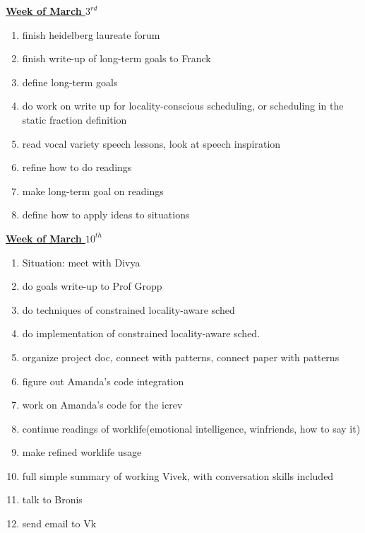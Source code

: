 
\underline{\textbf{Week of March $3^{rd}$}} \\
\begin{enumerate}
\item finish heidelberg laureate forum
\item finish write-up of long-term goals to Franck

\item  define long-term goals
\item  do work on write up for locality-conscious scheduling, or scheduling in the static fraction definition

\item read vocal variety speech lessons, look at speech inspiration
\item refine how to do readings
\item make long-term goal on readings
\item define how to apply ideas to situations

\end{enumerate}

\underline{\textbf{Week of March $10^{th}$}} \\
\begin{enumerate}

\item Situation: meet with Divya
\item do goals write-up to Prof Gropp

\item do techniques of constrained locality-aware sched
\item do implementation of constrained locality-aware sched.
\item organize project doc, connect with patterns, connect paper with patterns
\item figure out Amanda's code integration
\item work on Amanda's code for the icrev

\item continue readings of worklife(emotional intelligence, winfriends, how to say it)
\item make refined worklife usage
\item full simple summary of working Vivek, with conversation skills included

\item talk to Bronis
\item send email to Vk

\end{enumerate}

